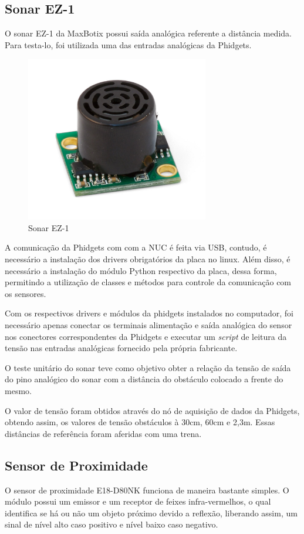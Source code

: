 		
	\subsection{Sonar EZ-1}
		O sonar EZ-1 da MaxBotix possui saída analógica referente a distância medida. Para testa-lo, foi utilizada uma das entradas analógicas da Phidgets.
		
		
		\begin{figure}[!ht]
		   \centering
		   \includegraphics[width=8cm]{Figures/ez1.jpg}
		   \caption{Sonar EZ-1}
		   \label{fig:ez1}
		\end{figure}
		
		A comunicação da Phidgets com com a NUC é feita via USB, contudo, é necessário a instalação dos drivers obrigatórios da placa no linux. Além disso, é necessário a instalação do módulo Python respectivo da placa, dessa forma, permitindo a utilização de classes e métodos para controle da comunicação com os sensores.
		
		Com os respectivos drivers e módulos da phidgets instalados no computador, foi necessário apenas conectar os terminais alimentação e saída analógica do sensor nos conectores correspondentes da Phidgets e executar um \textit{script} de leitura da tensão nas entradas analógicas fornecido pela própria fabricante. 
		
		O teste unitário do sonar teve como objetivo obter a relação da tensão de saída do pino analógico do sonar com a distância do obstáculo colocado a frente do mesmo.
		
		O valor de tensão foram obtidos através do nó de aquisição de dados da Phidgets, obtendo assim, os valores de tensão obstáculos à 30cm, 60cm e 2,3m. Essas distâncias de referência foram aferidas com uma trena.

	
	\subsection{Sensor de Proximidade}
		O sensor de proximidade E18-D80NK funciona de maneira bastante simples. O módulo possui um emissor e um receptor de feixes infra-vermelhos, o qual identifica se há ou não um objeto próximo devido a reflexão, liberando assim, um sinal de nível alto caso positivo e nível baixo caso negativo.
		

